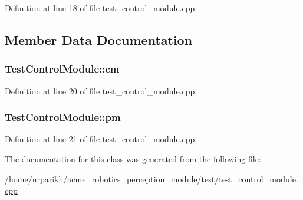 Definition at line 18 of file test\+\_\+control\+\_\+module.\+cpp.



\subsection{Member Data Documentation}
\subsubsection[{\texorpdfstring{cm}{cm}}]{ Test\+Control\+Module\+::cm\hspace{0.3cm}{\ttfamily [protected]}}\hypertarget{class_test_control_module_a8b31203bb99dac1486c80c5c270673a3}{}\label{class_test_control_module_a8b31203bb99dac1486c80c5c270673a3}


Definition at line 20 of file test\+\_\+control\+\_\+module.\+cpp.

\subsubsection[{\texorpdfstring{pm}{pm}}]{ Test\+Control\+Module\+::pm\hspace{0.3cm}{\ttfamily [protected]}}\hypertarget{class_test_control_module_ad498100deff15c962c1d6e933901f7cf}{}\label{class_test_control_module_ad498100deff15c962c1d6e933901f7cf}


Definition at line 21 of file test\+\_\+control\+\_\+module.\+cpp.



The documentation for this class was generated from the following file\+:\begin{DoxyCompactItemize}
\item 
/home/nrparikh/acme\+\_\+robotics\+\_\+perception\+\_\+module/test/\hyperlink{test__control__module_8cpp}{test\+\_\+control\+\_\+module.\+cpp}\end{DoxyCompactItemize}
